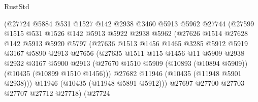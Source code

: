 \begin{lexlean}{RustStd}
\begin{coremodule}
                          (@27724
                            @5884
                            @531
                            @1527
                            @142
                            @2938
                            @3460
                            @5913
                            @5962
                            @27744
                            (@27599
                              @1515
                              @531
                              @1526
                              @142
                              @5913
                              @5922
                              @2938
                              @5962
                              (@27626
                                @1514
                                @27628
                                @142
                                @5913
                                @5920
                                @5797
                                (@27636
                                  @1513
                                  @1456
                                  @1465
                                  @3285
                                  @5912
                                  @5919
                                  @3167
                                  @5890
                                  @2913
                                  @27656
                                  (@27635
                                    @1511
                                    @115
                                    @1456
                                    @11
                                    @5909
                                    @2938
                                    @2932
                                    @3167
                                    @5900
                                    @2913
                                    (@27670
                                      @1510
                                      @5909
                                      (@10893 (@10894 @5909))
                                      (@10435 (@10899 @1510 @1456)))
                                    @27682
                                    @11946
                                    (@10435 (@11948 @5901 @2938)))
                                  @11946
                                  (@10435 (@11948 @5891 @5912)))
                                @27697
                                @27700
                                @27703
                                @27707
                                @27712
                                @27718)
                              (@27724

\end{coremodule}
\end{lexlean}
